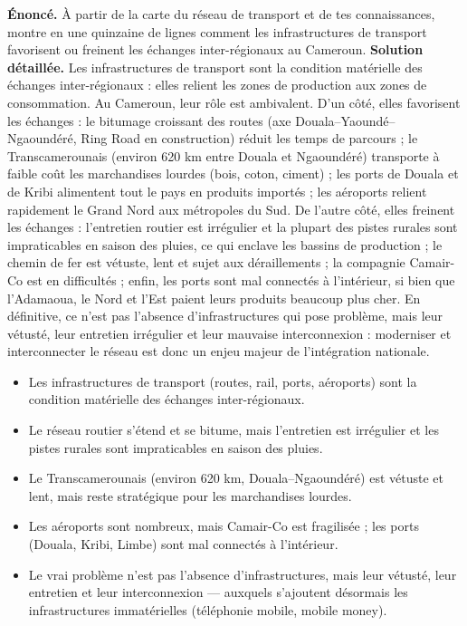 \documentclass[11pt]{article}
\begin{document}
\begin{exoresolu}
\textbf{Énoncé.} À partir de la carte du réseau de transport et de tes connaissances, montre en une quinzaine de lignes comment les infrastructures de transport favorisent ou freinent les échanges inter-régionaux au Cameroun.
\tcblower
\textbf{Solution détaillée.} Les infrastructures de transport sont la condition matérielle des échanges inter-régionaux : elles relient les zones de production aux zones de consommation. Au Cameroun, leur rôle est ambivalent. D'un côté, elles favorisent les échanges : le bitumage croissant des routes (axe Douala--Yaoundé--Ngaoundéré, Ring Road en construction) réduit les temps de parcours ; le Transcamerounais (environ 620 km entre Douala et Ngaoundéré) transporte à faible coût les marchandises lourdes (bois, coton, ciment) ; les ports de Douala et de Kribi alimentent tout le pays en produits importés ; les aéroports relient rapidement le Grand Nord aux métropoles du Sud. De l'autre côté, elles freinent les échanges : l'entretien routier est irrégulier et la plupart des pistes rurales sont impraticables en saison des pluies, ce qui enclave les bassins de production ; le chemin de fer est vétuste, lent et sujet aux déraillements ; la compagnie Camair-Co est en difficultés ; enfin, les ports sont mal connectés à l'intérieur, si bien que l'Adamaoua, le Nord et l'Est paient leurs produits beaucoup plus cher. En définitive, ce n'est pas l'absence d'infrastructures qui pose problème, mais leur vétusté, leur entretien irrégulier et leur mauvaise interconnexion : moderniser et interconnecter le réseau est donc un enjeu majeur de l'intégration nationale.
\end{exoresolu}

\begin{aretenir}
\begin{itemize}
\item Les infrastructures de transport (routes, rail, ports, aéroports) sont la condition matérielle des échanges inter-régionaux.
\item Le réseau routier s'étend et se bitume, mais l'entretien est irrégulier et les pistes rurales sont impraticables en saison des pluies.
\item Le Transcamerounais (environ 620 km, Douala--Ngaoundéré) est vétuste et lent, mais reste stratégique pour les marchandises lourdes.
\item Les aéroports sont nombreux, mais Camair-Co est fragilisée ; les ports (Douala, Kribi, Limbe) sont mal connectés à l'intérieur.
\item Le vrai problème n'est pas l'absence d'infrastructures, mais leur vétusté, leur entretien et leur interconnexion — auxquels s'ajoutent désormais les infrastructures immatérielles (téléphonie mobile, mobile money).
\end{itemize}
\end{aretenir}
\end{document}
